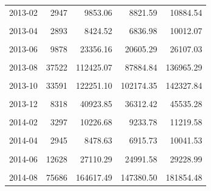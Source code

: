 \begin{longtable}[t]{crrrr}
2013-02 & 2947 & 9853.06 & 8821.59 & 10884.54\\
\cellcolor{gray!10}{2013-03} & \cellcolor{gray!10}{4054} & \cellcolor{gray!10}{10089.74} & \cellcolor{gray!10}{8734.33} & \cellcolor{gray!10}{11445.14}\\
2013-04 & 2893 & 8424.52 & 6836.98 & 10012.07\\
\cellcolor{gray!10}{2013-05} & \cellcolor{gray!10}{7089} & \cellcolor{gray!10}{15561.09} & \cellcolor{gray!10}{14176.72} & \cellcolor{gray!10}{16945.47}\\
2013-06 & 9878 & 23356.16 & 20605.29 & 26107.03\\
\cellcolor{gray!10}{2013-07} & \cellcolor{gray!10}{15743} & \cellcolor{gray!10}{37120.75} & \cellcolor{gray!10}{31367.40} & \cellcolor{gray!10}{42874.10}\\
2013-08 & 37522 & 112425.07 & 87884.84 & 136965.29\\
\cellcolor{gray!10}{2013-09} & \cellcolor{gray!10}{59535} & \cellcolor{gray!10}{196334.73} & \cellcolor{gray!10}{166012.88} & \cellcolor{gray!10}{226656.58}\\
2013-10 & 33591 & 122251.10 & 102174.35 & 142327.84\\
\cellcolor{gray!10}{2013-11} & \cellcolor{gray!10}{10179} & \cellcolor{gray!10}{63297.10} & \cellcolor{gray!10}{52398.95} & \cellcolor{gray!10}{74195.26}\\
2013-12 & 8318 & 40923.85 & 36312.42 & 45535.28\\
\cellcolor{gray!10}{2014-01} & \cellcolor{gray!10}{4073} & \cellcolor{gray!10}{15924.08} & \cellcolor{gray!10}{13470.19} & \cellcolor{gray!10}{18377.97}\\
2014-02 & 3297 & 10226.68 & 9233.78 & 11219.58\\
\cellcolor{gray!10}{2014-03} & \cellcolor{gray!10}{3724} & \cellcolor{gray!10}{9871.47} & \cellcolor{gray!10}{8486.45} & \cellcolor{gray!10}{11256.49}\\
2014-04 & 2945 & 8478.63 & 6915.73 & 10041.53\\
\cellcolor{gray!10}{2014-05} & \cellcolor{gray!10}{5266} & \cellcolor{gray!10}{12703.25} & \cellcolor{gray!10}{10952.65} & \cellcolor{gray!10}{14453.85}\\
2014-06 & 12628 & 27110.29 & 24991.58 & 29228.99\\
\cellcolor{gray!10}{2014-07} & \cellcolor{gray!10}{18671} & \cellcolor{gray!10}{46455.71} & \cellcolor{gray!10}{42247.60} & \cellcolor{gray!10}{50663.82}\\
2014-08 & 75686 & 164617.49 & 147380.50 & 181854.48\\

\end{longtable}
